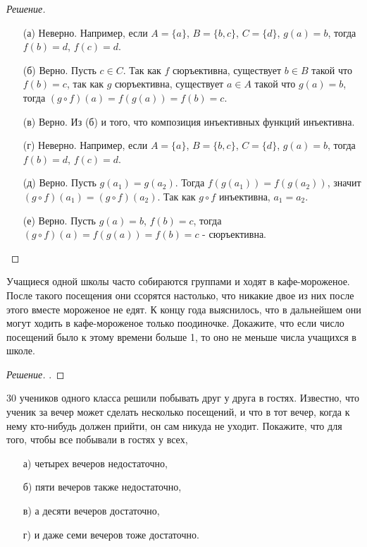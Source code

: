 \documentclass{article}
\begin{document}
\begin{proof}[Решение]\
\begin{enumerate}
    \item[(а)] Неверно. Например, если $A = \{a\}$, $B = \{b,c\}$, $C = \{d\}$, $g(a) = b$, тогда $f(b) = d$, $f(c) = d$.
    
    \item[(б)] Верно. Пусть $c \in C$. Так как $f$ сюръективна, существует $b \in B$ такой что $f(b) = c$, так как $g$ сюръективна, существует $a \in A$ такой что $g(a) = b$, тогда $(g\circ f)(a) = f(g(a)) = f(b) = c$.
    
    \item[(в)] Верно. Из (б) и того, что композиция инъективных функций инъективна.
    
    \item[(г)] Неверно. Например, если $A = \{a\}$, $B = \{b,c\}$, $C = \{d\}$, $g(a) = b$, тогда $f(b) = d$, $f(c) = d$.
    
    \item[(д)] Верно. Пусть $g(a_1) = g(a_2)$. Тогда $f(g(a_1)) = f(g(a_2))$, значит $(g\circ f)(a_1) = (g\circ f)(a_2)$. Так как $g\circ f$ инъективна, $a_1 = a_2$.
    
    \item[(е)] Верно. Пусть $g(a) = b$, $f(b) = c$, тогда $(g\circ f)(a) = f(g(a)) = f(b) = c $ - сюръективна.
\end{enumerate}
\end{proof}

\begin{task}[3]
Учащиеся одной школы часто собираются группами и ходят в кафе-мороженое. После такого посещения они ссорятся настолько, что никакие двое из них после этого вместе мороженое не едят. К концу года выяснилось, что в дальнейшем они могут ходить в кафе-мороженое только поодиночке. Докажите, что если число посещений было к этому времени больше 1, то оно не меньше числа учащихся в школе.
\end{task}

\begin{proof}[Решение]
.
\end{proof}

\begin{task}[3]
30 учеников одного класса решили побывать друг у друга в гостях. Известно, что ученик за вечер может сделать несколько посещений, и что в тот вечер, когда к нему кто-нибудь должен прийти, он сам никуда не уходит. Покажите, что для того, чтобы все побывали в гостях у всех,
\begin{enumerate}
    \item[а)] четырех вечеров недостаточно,
    \item[б)] пяти вечеров также недостаточно,
    \item[в)] а десяти вечеров достаточно,
    \item[г)] и даже семи вечеров тоже достаточно.
\end{enumerate}
\end{task}
\end{document}
